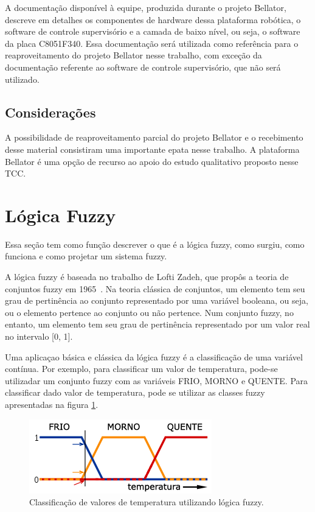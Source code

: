 A documentação disponível à equipe, produzida durante o projeto Bellator, descreve em detalhes os componentes de hardware dessa plataforma robótica, o software de controle supervisório e a camada de baixo nível, ou seja, o software da placa C8051F340\cite{BELLATOR}. Essa documentação será utilizada como referência para o reaproveitamento do projeto Bellator nesse trabalho, com exceção da documentação referente ao software de controle supervisório, que não será utilizado.

\subsection{Considerações}
A possibilidade de reaproveitamento parcial do projeto Bellator e o recebimento desse material consistiram uma importante epata nesse trabalho. A plataforma Bellator é uma opção de recurso ao apoio do estudo qualitativo proposto nesse TCC.



\section{Lógica Fuzzy}
Essa seção tem como função descrever o que é a lógica fuzzy, como surgiu, como funciona e como projetar um sistema fuzzy.

A lógica fuzzy é baseada no trabalho de Lofti Zadeh, que propôs a teoria de conjuntos
fuzzy em 1965~\cite{FUZZYLOGIC}. Na teoria clássica de conjuntos, um elemento tem seu
grau de pertinência ao conjunto representado por uma variável booleana, ou seja, ou o elemento
pertence ao conjunto ou não pertence. Num conjunto fuzzy, no entanto, um elemento tem seu grau
de pertinência representado por um valor real no intervalo [0, 1].

Uma aplicaçao básica e clássica da lógica fuzzy é a classificação de uma variável contínua. Por exemplo,
para classificar um valor de temperatura, pode-se utilizadar um conjunto fuzzy com as variáveis
FRIO, MORNO e QUENTE. Para classificar dado valor de temperatura, pode se utilizar as classes fuzzy apresentadas
 na figura \ref{fig:fuzzyclasses}.

\begin{figure}[!htb]
    \centering
    \includegraphics{./figs/fuzzyclasses.png}
    \caption[Classificação Fuzzy]{Classificação de valores de temperatura utilizando lógica fuzzy.}
    \label{fig:fuzzyclasses}
\end{figure}

